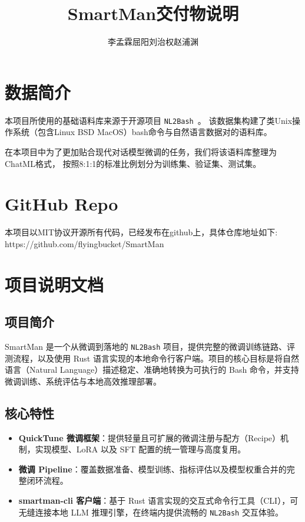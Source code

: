 \documentclass[UTF8,a4paper,12pt]{ctexart}
\title{SmartMan交付物说明}
\author{李孟霖\quad 屈阳\quad 刘治权\quad 赵浦渊}
\date{}
\begin{document}
\maketitle{}
\section{数据简介}
本项目所使用的基础语料库来源于开源项目 \texttt{NL2Bash}~\cite{LinWZE2018:NL2Bash}。
该数据集构建了类Unix操作系统（包含Linux BSD MacOS）bash命令与自然语言数据对的语料库。

在本项目中为了更加贴合现代对话模型微调的任务，我们将该语料库整理为ChatML格式，
按照8:1:1的标准比例划分为训练集、验证集、测试集。

\section{GitHub Repo}
本项目以MIT协议开源所有代码，已经发布在github上，具体仓库地址如下:
https://github.com/flyingbucket/SmartMan

\section{项目说明文档}
\subsection{项目简介}
SmartMan 是一个从微调到落地的 \texttt{NL2Bash} 项目，提供完整的微调训练链路、评测流程，以及使用 Rust 语言实现的本地命令行客户端。项目的核心目标是将自然语言（Natural Language）描述稳定、准确地转换为可执行的 Bash 命令，并支持微调训练、系统评估与本地高效推理部署。

\subsection{核心特性}
\begin{itemize}
  \item \textbf{QuickTune 微调框架}：提供轻量且可扩展的微调注册与配方（Recipe）机制，实现模型、LoRA 以及 SFT 配置的统一管理与高度复用。
    \item \textbf{微调 Pipeline}：覆盖数据准备、模型训练、指标评估以及模型权重合并的完整闭环流程。
    \item \textbf{smartman-cli 客户端}：基于 Rust 语言实现的交互式命令行工具（CLI），可无缝连接本地 LLM 推理引擎，在终端内提供流畅的 \texttt{NL2Bash} 交互体验。
\end{itemize}
\end{document}
